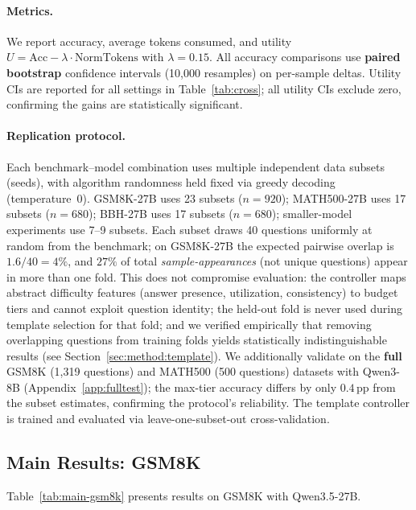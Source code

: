 \paragraph{Metrics.}
We report accuracy, average tokens consumed, and utility $U = \text{Acc} - \lambda \cdot \text{NormTokens}$ with $\lambda = 0.15$.
All accuracy comparisons use \textbf{paired bootstrap} confidence intervals (10,000 resamples) on per-sample deltas.
Utility CIs are reported for all settings in Table~\ref{tab:cross}; all utility CIs exclude zero, confirming the gains are statistically significant.

\paragraph{Replication protocol.}
Each benchmark--model combination uses multiple independent data subsets (seeds), with algorithm randomness held fixed via greedy decoding (temperature~0).
GSM8K-27B uses 23 subsets ($n = 920$); MATH500-27B uses 17 subsets ($n = 680$); BBH-27B uses 17 subsets ($n = 680$); smaller-model experiments use 7--9 subsets.
Each subset draws 40 questions uniformly at random from the benchmark; on GSM8K-27B the expected pairwise overlap is $1.6/40 = 4\%$, and $27\%$ of total \emph{sample-appearances} (not unique questions) appear in more than one fold.
This does not compromise evaluation: the controller maps abstract difficulty features (answer presence, utilization, consistency) to budget tiers and cannot exploit question identity; the held-out fold is never used during template selection for that fold; and we verified empirically that removing overlapping questions from training folds yields statistically indistinguishable results (see Section~\ref{sec:method:template}).
We additionally validate on the \textbf{full} GSM8K (1,319 questions) and MATH500 (500 questions) datasets with Qwen3-8B (Appendix~\ref{app:fulltest}); the max-tier accuracy differs by only $0.4$\,pp from the subset estimates, confirming the protocol's reliability.
The template controller is trained and evaluated via leave-one-subset-out cross-validation.

\subsection{Main Results: GSM8K}
\label{sec:exp:main}

Table~\ref{tab:main-gsm8k} presents results on GSM8K with Qwen3.5-27B.

